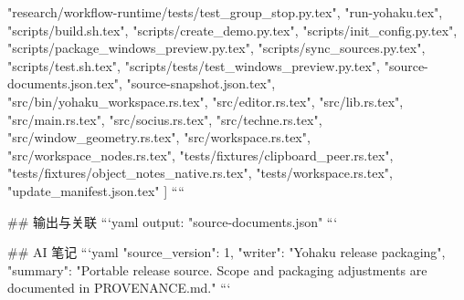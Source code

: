 {    "research/workflow-runtime/tests/test_group_stop.py.tex",
    "run-yohaku.tex",
    "scripts/build.sh.tex",
    "scripts/create_demo.py.tex",
    "scripts/init_config.py.tex",
    "scripts/package_windows_preview.py.tex",
    "scripts/sync_sources.py.tex",
    "scripts/test.sh.tex",
    "scripts/tests/test_windows_preview.py.tex",
    "source-documents.json.tex",
    "source-snapshot.json.tex",
    "src/bin/yohaku_workspace.rs.tex",
    "src/editor.rs.tex",
    "src/lib.rs.tex",
    "src/main.rs.tex",
    "src/socius.rs.tex",
    "src/techne.rs.tex",
    "src/window_geometry.rs.tex",
    "src/workspace.rs.tex",
    "src/workspace_nodes.rs.tex",
    "tests/fixtures/clipboard_peer.rs.tex",
    "tests/fixtures/object_notes_native.rs.tex",
    "tests/workspace.rs.tex",
    "update_manifest.json.tex"
  ]
}
````

## 输出与关联
```yaml
output: "source-documents.json"
```

## AI 笔记
```yaml
{"source_version": 1, "writer": "Yohaku release packaging", "summary": "Portable release source. Scope and packaging adjustments are documented in PROVENANCE.md."}
```

